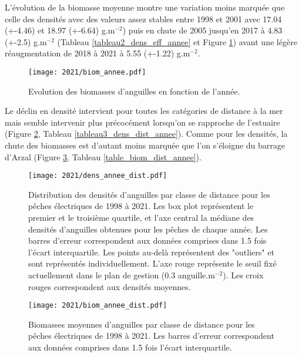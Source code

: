 \documentclass[10pt,twocolumn,titlepage,twoside]{article}\usepackage[]{graphicx}\usepackage[]{color}
\begin{document}
L'évolution de la biomasse moyenne montre une variation moins marquée que celle
des densités avec des valeurs assez stables entre 1998 et 2001 avec 
17.04 (+-4.46) et
18.97 (+-6.64) g.m$^{-2}$) puis en chute de 2005 jusqu'en 2017
à 4.83  (+-2.5) g.m$^{-2}$ (Tableau \ref{tableau2_dens_eff_annee}
et Figure \ref{biom_annee}) avant une légère réaugmentation de 2018 à 2021 à
5.55  (+-1.22) g.m$^{-2}$.


\begin{figure}[htbp]
\centering
 \texttt{[image: 2021/biom\_annee.pdf]} 
\caption[Biomasses d'anguilles.]{Evolution des biomasses d'anguilles en fonction
de l'année.}
\label{biom_annee}
\end{figure}

Le déclin en densité intervient pour toutes les catégories de distance à la mer 
mais semble intervenir plus précocément
lorsqu'on se rapproche de l'estuaire (Figure \ref{dens_annee_distance},
Tableau \ref{tableau3_dens_dist_annee}).
Comme pour les densités, la chute des biomasses est
d'autant moins marquée que l'on s'éloigne du barrage d'Arzal (Figure
\ref{biom_annee_dist}, Tableau \ref{table_biom_dist_annee}).

\begin{figure}[htbp]
  \centering
    \texttt{[image: 2021/dens\_annee\_dist.pdf]}
    \caption[Densité moyennes $\sim$ distance.]{Distribution des densités
    d'anguilles par classe de distance pour les pêches
    électriques de 1998 à 2021. Les box plot représentent le premier
    et le troisième quartile, et l'axe central la médiane des densités
    d'anguilles obtenues pour les pêches de chaque année. Les barres d'erreur correspondent aux données comprises dans 1.5 fois l'écart
    interquartile. Les points au-delà représentent des "outliers" et sont
    représentés individuellement. L'axe rouge représente le seuil fixé
    actuellement dans le plan de gestion (0.3 anguille.m$^{-2}$).
     Les croix rouges correspondent aux densités
    moyennes.}
  \label{dens_annee_distance}
\end{figure} 
    
\small

\normalsize

\begin{figure}[htbp]
  \centering
  \texttt{[image: 2021/biom\_annee\_dist.pdf]}
  \caption[_court]{Biomasses moyennes d'anguilles par classe de distance pour les pêches
  électriques de 1998 à 2021. Les barres d'erreur
  correspondent aux données comprises dans 1.5 fois
  l'écart interquartile.}
  \label{biom_annee_dist}
\end{figure}
\end{document}
